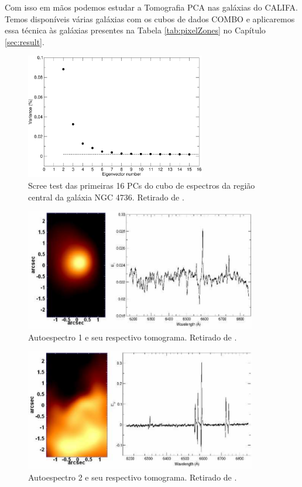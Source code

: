 Com isso em mãos podemos estudar a Tomografia PCA nas galáxias do CALIFA. Temos
disponíveis várias galáxias com os cubos de dados COMBO e aplicaremos essa
técnica às galáxias presentes na Tabela \ref{tab:pixelZones} no Capítulo
\ref{sec:result}.
\begin{figure}
    \includegraphics[width=0.7\textwidth]{figuras/figSteiner2009fig1.pdf}
    \caption[{\em Scree test} na galáxia NGC 4736.]
    {Scree test das primeiras 16 PCs do cubo de espectros da região
    central da galáxia NGC 4736. Retirado de \citet[][fig. 1]{Steiner2009}.}
    \label{fig:TomoPCA:scree}
\end{figure}
\begin{figure}
    \includegraphics[width=0.9\textwidth]{figuras/figSteiner2009figA1.pdf}
    \caption[Tomograma e autoespectro 1 da galáxia NGC 4736.]
    {Autoespectro 1 e seu respectivo tomograma. Retirado de \citet[][fig.
    A1]{Steiner2009}.}
    \label{fig:TomoPCA:eigspec1}
\end{figure}
\begin{figure}
    \includegraphics[width=0.9\textwidth]{figuras/figSteiner2009figA2.pdf}
    \caption[Tomograma e autoespectro 2 da galáxia NGC 4736.]
    {Autoespectro 2 e seu respectivo tomograma. Retirado de \citet[][fig.
    A2]{Steiner2009}.}
    \label{fig:TomoPCA:eigspec2}
\end{figure}
